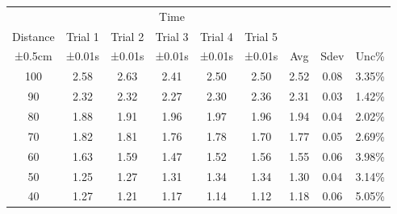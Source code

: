 \documentclass[12pt]{report}
\begin{document}
\begin{table}[]
    \begin{tabular}{ccccccccc}
        \cellcolor[HTML]{6D9EEB}                           & \multicolumn{5}{c}{\cellcolor[HTML]{93C47D}Time} &         &         &                                                                                              \\
        \multirow{-2}{*}{\cellcolor[HTML]{6D9EEB}Distance} & Trial 1                                          & Trial 2 & Trial 3 & Trial 4 & Trial 5 &                       &                        &                         \\
        ±0.5cm                                             & ±0.01s                                           & ±0.01s  & ±0.01s  & ±0.01s  & ±0.01s  & \multirow{-3}{*}{Avg} & \multirow{-3}{*}{Sdev} & \multirow{-3}{*}{Unc\%} \\
        100                                                & 2.58                                             & 2.63    & 2.41    & 2.50    & 2.50    & 2.52                  & 0.08                   & 3.35\%                  \\
        90                                                 & 2.32                                             & 2.32    & 2.27    & 2.30    & 2.36    & 2.31                  & 0.03                   & 1.42\%                  \\
        80                                                 & 1.88                                             & 1.91    & 1.96    & 1.97    & 1.96    & 1.94                  & 0.04                   & 2.02\%                  \\
        70                                                 & 1.82                                             & 1.81    & 1.76    & 1.78    & 1.70    & 1.77                  & 0.05                   & 2.69\%                  \\
        60                                                 & 1.63                                             & 1.59    & 1.47    & 1.52    & 1.56    & 1.55                  & 0.06                   & 3.98\%                  \\
        50                                                 & 1.25                                             & 1.27    & 1.31    & 1.34    & 1.34    & 1.30                  & 0.04                   & 3.14\%                  \\
        40                                                 & 1.27                                             & 1.21    & 1.17    & 1.14    & 1.12    & 1.18                  & 0.06                   & 5.05\%                  \\

\end{tabular}
\end{table}
\end{document}

